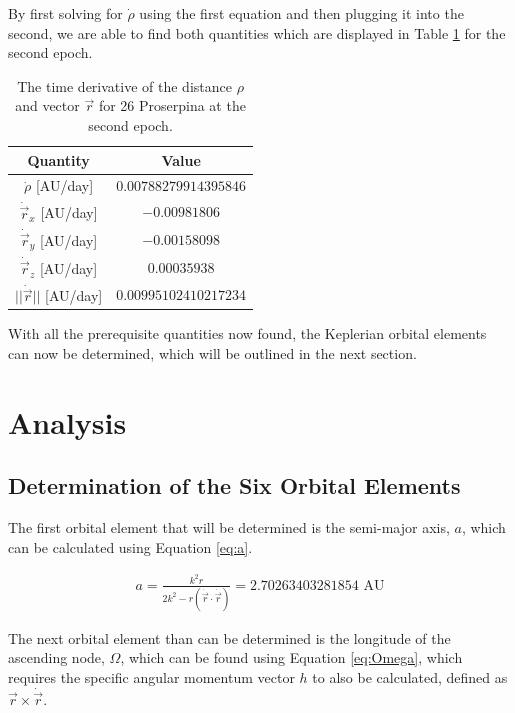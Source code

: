 \documentclass{article}
\begin{document}
By first solving for $\dot{\rho}$ using the first equation and then plugging it into the second, we are able to find both quantities which are 
displayed in Table \ref{tab:rho_r_dot} for the second epoch.

\begin{table}[H]
\centering
\begin{tabular}{|c|c|}
    \hline 
    \textbf{Quantity} & \textbf{Value} \\
    \hline
    $\dot{\rho}$ [AU/day] & $0.00788279914395846$ \\
    \hline
    $\dot{\vec{r}}_{x}$ [AU/day] & $-0.00981806$ \\
    \hline
    $\dot{\vec{r}}_{y}$ [AU/day] & $-0.00158098$ \\
    \hline
    $\dot{\vec{r}}_{z}$ [AU/day] & $0.00035938$ \\
    \hline
    $||\dot{\vec{r}}||$ [AU/day] & $0.00995102410217234$ \\
    \hline
\end{tabular}
    \caption{The time derivative of the distance $\rho$ and vector $\vec{r}$ for 26 Proserpina at the second epoch.}
    \label{tab:rho_r_dot}
\end{table}

With all the prerequisite quantities now found, the Keplerian orbital elements can now be determined, which will be outlined in the next section.

\section{Analysis}
\subsection{Determination of the Six Orbital Elements}
The first orbital element that will be determined is the semi-major axis, $a$, which can be calculated using Equation \ref{eq:a}.

\begin{equation}
    \label{eq:a}
    \begin{aligned}
        a = \frac{k^2r}{2k^2 - r(\dot{\vec{r}} \cdot \dot{\vec{r}})} = 2.70263403281854 \text{ AU}
    \end{aligned}
\end{equation}

\noindent
The next orbital element than can be determined is the longitude of the ascending node, $\Omega$, which can be found using Equation \ref{eq:Omega}, which 
requires the specific angular momentum vector $h$ to also be calculated, defined as $\vec{r} \times \dot{\vec{r}}$.
\end{document}

